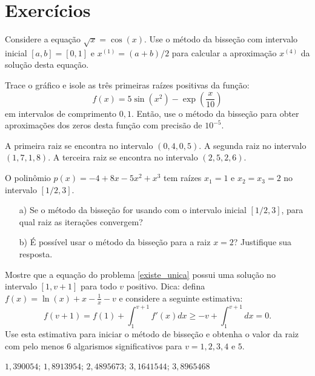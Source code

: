 
\fi

\section*{Exercícios}

\begin{Exercise}Considere a equação $\sqrt{x}=\cos(x)$. Use o método da bisseção com intervalo inicial $[a, b] = [0, 1]$ e $x^{(1)} = (a+b)/2$ para calcular a aproximação $x^{(4)}$ da solução desta equação.
\end{Exercise}

\begin{Exercise} Trace o gráfico e isole as três primeiras raízes positivas da função:
  \begin{equation*}
    f(x)=5\sin(x^2)-\exp\left({\frac{x}{10}}\right)  
  \end{equation*}
em intervalos de comprimento $0,1$. Então, use o método da bisseção para obter aproximações dos zeros desta função com precisão de $10^{-5}$.
\end{Exercise}
\begin{Answer}
  \begin{tiny}
    A primeira raiz se encontra no intervalo $(0,4, 0,5)$. A segunda raiz no intervalo $(1,7, 1,8)$. A terceira raiz se encontra no intervalo $(2,5, 2,6)$.    
  \end{tiny}
\end{Answer}

\begin{ex}\label{exer:raizes_multiplas}
  O polinômio $p(x) = -4 + 8x - 5x^2 + x^3$ tem raízes $x_1=1$ e $x_2=x_3=2$ no intervalo $[1/2, 3]$.
  \begin{itemize}
  \item[a)] Se o método da bisseção for usando com o intervalo inicial $[1/2, 3]$, para qual raiz as iterações convergem?
  \item[b)] É possível usar o método da bisseção para a raiz $x=2$? Justifique sua resposta.
  \end{itemize}
\end{ex}

\begin{Exercise} Mostre que a equação do problema \ref{existe_unica} possui uma solução no intervalo $[1, v+1]$ para todo $v$ positivo. Dica: defina $f(x)=\ln(x)+x-\frac{1}{x}-v$  e considere a seguinte estimativa:
  \begin{equation*}
    f(v+1)=f(1)+\int_1^{v+1}f'(x)dx\geq -v+\int_1^{v+1}dx=0.  
  \end{equation*}
Use esta estimativa para iniciar o método de bisseção e obtenha o valor da raiz com pelo menos 6 algarismos significativos para $v=1, 2, 3, 4$ e $5$.
\end{Exercise}
\begin{Answer}
  \begin{tiny}
    $1,390054$; $1,8913954$; $2,4895673$; $3,1641544$; $3,8965468$    
  \end{tiny}
\end{Answer}

